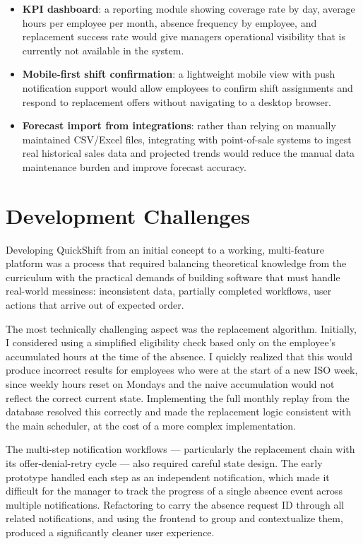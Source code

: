 \begin{itemize}
    \item \textbf{KPI dashboard}: a reporting module showing coverage rate by day, average hours per employee per month, absence frequency by employee, and replacement success rate would give managers operational visibility that is currently not available in the system.
    \item \textbf{Mobile-first shift confirmation}: a lightweight mobile view with push notification support would allow employees to confirm shift assignments and respond to replacement offers without navigating to a desktop browser.
    \item \textbf{Forecast import from integrations}: rather than relying on manually maintained CSV/Excel files, integrating with point-of-sale systems to ingest real historical sales data and projected trends would reduce the manual data maintenance burden and improve forecast accuracy.
\end{itemize}

\section{Development Challenges}
\par Developing QuickShift from an initial concept to a working, multi-feature platform was a process that required balancing theoretical knowledge from the curriculum with the practical demands of building software that must handle real-world messiness: inconsistent data, partially completed workflows, user actions that arrive out of expected order.

\par The most technically challenging aspect was the replacement algorithm. Initially, I considered using a simplified eligibility check based only on the employee's accumulated hours at the time of the absence. I quickly realized that this would produce incorrect results for employees who were at the start of a new ISO week, since weekly hours reset on Mondays and the naive accumulation would not reflect the correct current state. Implementing the full monthly replay from the database resolved this correctly and made the replacement logic consistent with the main scheduler, at the cost of a more complex implementation.

\par The multi-step notification workflows — particularly the replacement chain with its offer-denial-retry cycle — also required careful state design. The early prototype handled each step as an independent notification, which made it difficult for the manager to track the progress of a single absence event across multiple notifications. Refactoring to carry the absence request ID through all related notifications, and using the frontend to group and contextualize them, produced a significantly cleaner user experience.


